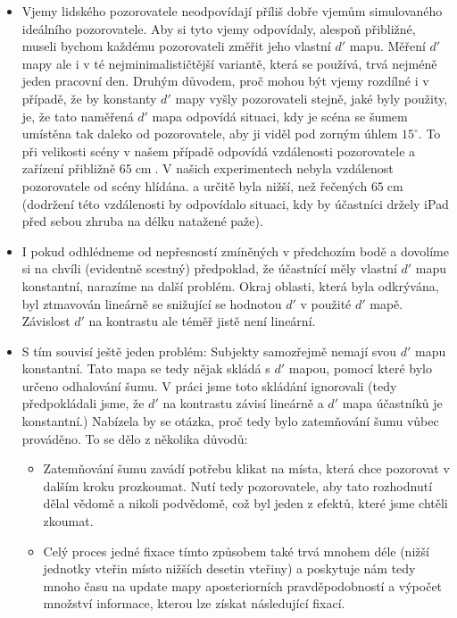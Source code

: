 \begin{itemize}
\item Vjemy lidského pozorovatele neodpovídají příliš dobře vjemům simulovaného
ideálního pozorovatele. Aby si tyto vjemy odpovídaly, alespoň přibližné, museli
bychom každému pozorovateli změřit jeho vlastní $d'$ mapu. Měření $d'$ mapy ale
i  v té nejminimalističtější variantě, která se používá, trvá nejméně jeden
pracovní den. Druhým důvodem, proč mohou být vjemy rozdílné i v případě, že by
konstanty $d'$ mapy vyšly pozorovateli stejně, jaké byly použity, je, že tato
naměřená $d'$ mapa odpovídá situaci, kdy je scéna se šumem umístěna tak daleko
od pozorovatele, aby ji viděl pod zorným úhlem $15^\circ$. To při velikosti
scény v našem případě odpovídá vzdálenosti pozorovatele a zařízení přibližně
$65 \operatorname{cm}$. V našich experimentech nebyla vzdálenost pozorovatele od
scény hlídána. a určitě byla nižší, než řečených $65 \operatorname{cm}$
(dodržení této vzdálenosti by odpovídalo situaci, kdy by účastníci držely iPad
před sebou zhruba na délku natažené paže). 

\item I pokud odhlédneme od nepřesností zmíněných v předchozím bodě a dovolíme
si na chvíli (evidentně scestný) předpoklad, že účastnící měly vlastní $d'$ mapu
konstantní, narazíme na další problém. Okraj oblasti, která byla odkrývána,
byl ztmavován lineárně se snižující se hodnotou $d'$ v použité $d'$ mapě.
Závislost $d'$ na kontrastu ale téměř jistě
není lineární.

\item S tím souvisí ještě jeden problém: Subjekty samozřejmě nemají svou $d'$
mapu konstantní. Tato mapa se tedy nějak skládá s $d'$ mapou, pomocí které
bylo určeno odhalování šumu. V práci jsme toto skládání ignorovali (tedy
předpokládali jsme, že $d'$ na kontrastu závisí lineárně a $d'$ mapa účastníků
je konstantní.) Nabízela by se otázka, proč tedy bylo zatemňování šumu vůbec
prováděno. To se dělo z několika důvodů:

\begin{itemize}

\item Zatemňování šumu zavádí potřebu klikat na místa, která chce pozorovat v
dalším kroku prozkoumat. Nutí tedy pozorovatele, aby tato rozhodnutí dělal
vědomě a nikoli podvědomě, což byl jeden z efektů, které jsme chtěli zkoumat.

\item Celý proces jedné fixace tímto způsobem také trvá mnohem déle (nižší
jednotky vteřin místo nižších desetin vteřiny) a poskytuje nám tedy mnoho času
na update mapy aposteriorních pravděpodobností a výpočet množství informace,
kterou lze získat následující fixací.


\end{itemize}
\end{itemize}
